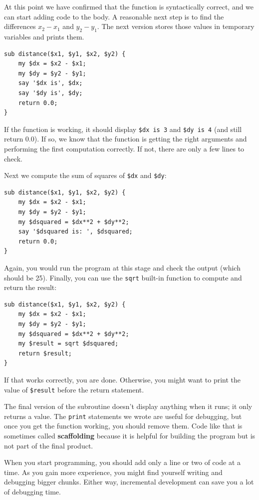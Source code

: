 At this point we have confirmed that the function is syntactically
correct, and we can start adding code to the body.
A reasonable next step is to find the differences
$x_2 - x_1$ and $y_2 - y_1$.  The next version stores those values in
temporary variables and prints them.

\begin{verbatim}
sub distance($x1, $y1, $x2, $y2) {
    my $dx = $x2 - $x1;
    my $dy = $y2 - $y1;
    say '$dx is', $dx;
    say '$dy is', $dy;
    return 0.0;
}
\end{verbatim}
%
If the function is working, it should display \verb"$dx is 3" and 
\verb"$dy is 4" (and still return 0.0).  If so, we know that the 
function is getting the right arguments and performing the 
first computation correctly.  If not, there are only a few lines 
to check.

Next we compute the sum of squares of {\tt \$dx} and {\tt \$dy}:

\begin{verbatim}
sub distance($x1, $y1, $x2, $y2) {
    my $dx = $x2 - $x1;
    my $dy = $y2 - $y1;
    my $dsquared = $dx**2 + $dy**2;
    say '$dsquared is: ', $dsquared;
    return 0.0;
}
\end{verbatim}
%
Again, you would run the program at this stage and check the output
(which should be 25).
Finally, you can use the {\tt sqrt} built-in function to compute 
and return the result:

\begin{verbatim}
sub distance($x1, $y1, $x2, $y2) {
    my $dx = $x2 - $x1;
    my $dy = $y2 - $y1;
    my $dsquared = $dx**2 + $dy**2;
    my $result = sqrt $dsquared;
    return $result;
}
\end{verbatim}
%
If that works correctly, you are done.  Otherwise, you might
want to print the value of {\tt \$result} before the return
statement.

The final version of the subroutine doesn't display anything when it
runs; it only returns a value.  The {\tt print} statements we wrote
are useful for debugging, but once you get the function working, you
should remove them.  Code like that is sometimes called 
{\bf scaffolding} because it is helpful for building the program 
but is not part of the final product.

When you start programming, you should add only a line or two of code at a
time.  As you gain more experience, you might find yourself writing
and debugging bigger chunks.  Either way, incremental development
can save you a lot of debugging time.

